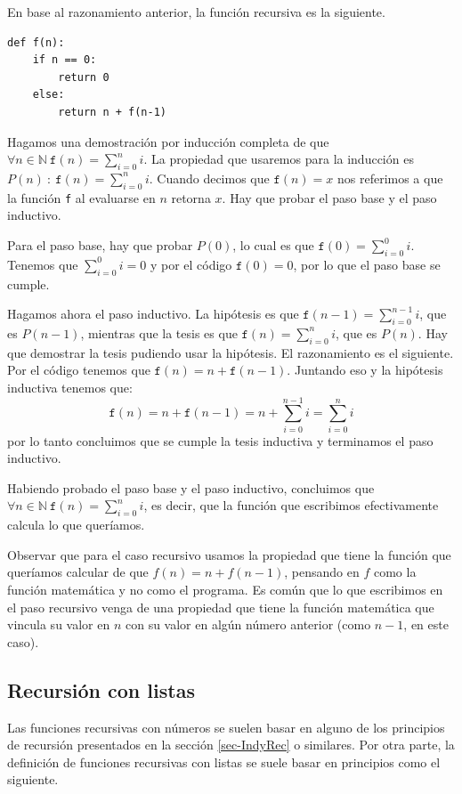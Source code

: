 \documentclass[a4paper, 12pt]{report}
\newcommand{\N}{\mathbb{N}}
\theoremstyle{definition}
\begin{document}
En base al razonamiento anterior, la función recursiva es la siguiente.
\begin{verbatim}
def f(n):
    if n == 0:
        return 0
    else:
        return n + f(n-1)
\end{verbatim}
Hagamos una demostración por inducción completa de que $\forall n\in\N ~\mathtt{f}(n)=\sum_{i=0}^ni$. La propiedad que usaremos para la inducción es $P(n)~:~\mathtt{f}(n)=\sum_{i=0}^ni$. Cuando decimos que $\mathtt{f}(n)=x$ nos referimos a que la función {\tt f} al evaluarse en $n$ retorna $x$. Hay que probar el paso base y el paso inductivo.

Para el paso base, hay que probar $P(0)$, lo cual es que $\mathtt{f}(0)=\sum_{i=0}^0i$. Tenemos que $\sum_{i=0}^0i=0$ y por el código $\mathtt{f}(0)=0$, por lo que el paso base se cumple.

Hagamos ahora el paso inductivo. La hipótesis es que $\mathtt{f}(n-1)=\sum_{i=0}^{n-1}i$, que es $P(n-1)$, mientras que la tesis es que $\mathtt{f}(n)=\sum_{i=0}^{n}i$, que es $P(n)$. Hay que demostrar la tesis pudiendo usar la hipótesis. El razonamiento es el siguiente. Por el código tenemos que $\mathtt{f}(n) = n + \mathtt{f}(n-1)$. Juntando eso y la hipótesis inductiva tenemos que:
$$\mathtt{f}(n) = n + \mathtt{f}(n-1) = n + \sum_{i=0}^{n-1}i=\sum_{i=0}^{n}i
$$
por lo tanto concluimos que se cumple la tesis inductiva y terminamos el paso inductivo.

Habiendo probado el paso base y el paso inductivo, concluimos que $\forall n\in\N ~\mathtt{f}(n)=\sum_{i=0}^ni$, es decir, que la función que escribimos efectivamente calcula lo que queríamos.

Observar que para el caso recursivo usamos la propiedad que tiene la función que queríamos calcular de que $f(n)=n+f(n-1)$, pensando en $f$ como la función matemática y no como el programa. Es común que lo que escribimos en el paso recursivo venga de una propiedad que tiene la función matemática que vincula su valor en $n$ con su valor en algún número anterior (como $n-1$, en este caso).

\subsection{Recursión con listas}

Las funciones recursivas con números se suelen basar en alguno de los principios de recursión presentados en la sección \ref{sec-IndyRec} o similares. Por otra parte, la definición de funciones recursivas con listas se suele basar en principios como el siguiente.
\end{document}
